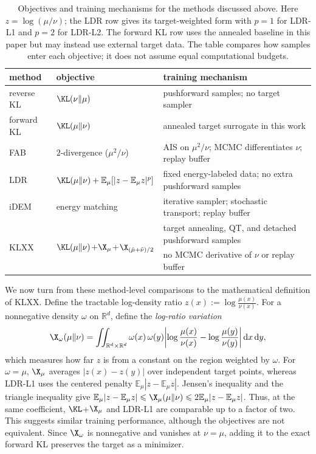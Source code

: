 \documentclass{article}
\begin{document}
\begin{table}[htb]
\centering
{\small
\begin{tabular}{@{}lll@{}}
\toprule
method & objective & training mechanism \\
\midrule
reverse KL & $\KL(\nu\|\mu)$ & pushforward samples; no target sampler \\
forward KL & $\KL(\mu\|\nu)$ & annealed target surrogate in this work \\
FAB & $2$-divergence ($\mu^2/\nu$) & AIS on $\mu^2/\nu$; MCMC differentiates $\nu$; replay buffer \\
LDR & $\KL(\mu\|\nu)+\mathbb E_\mu[|z-\mathbb E_\mu z|^p]$ & fixed energy-labeled data; no extra pushforward samples \\
iDEM & energy matching & iterative sampler; stochastic transport; replay buffer \\
\multirow{2}{*}{KLXX} &
\multirow{2}{*}{$\KL(\mu\|\nu)$+$\X_\mu$+$\X_{(\hat\mu+\bar\nu)/2}$} &
target annealing, QT, and detached pushforward samples \\
& & no MCMC derivative of $\nu$ or replay buffer \\
\bottomrule
\end{tabular}
}
\caption{Objectives and training mechanisms for the methods discussed above. Here $z=\log(\mu/\nu)$; the LDR row gives its target-weighted form with $p=1$ for LDR-L1 and $p=2$ for LDR-L2. The forward KL row uses the annealed baseline in this paper but may instead use external target data. The table compares how samples enter each objective; it does not assume equal computational budgets.}
\label{tab: methods}
\end{table}


We now turn from these method-level comparisons to the mathematical definition of KLXX. Define the tractable log-density ratio $z(x):=\log\frac{\mu(x)}{\nu(x)}$. For a nonnegative density $\omega$ on $\mathbb R^d$, define the \emph{log-ratio variation}
\begin{equation}
    \X_\omega(\mu\|\nu) = \iint_{\mathbb R^d\times\mathbb R^d} \omega(x)\,\omega(y)
    \biggl|\log\frac{\mu(x)}{\nu(x)} - \log\frac{\mu(y)}{\nu(y)}\biggr| \D x\D y,
    \label{eq: X}
\end{equation}
which measures how far $z$ is from a constant on the region weighted by $\omega$. For $\omega=\mu$, $\X_\mu$ averages $|z(x)-z(y)|$ over independent target points, whereas LDR-L1 uses the centered penalty $\mathbb E_\mu|z-\mathbb E_\mu z|$. Jensen's inequality and the triangle inequality give $\mathbb E_\mu|z-\mathbb E_\mu z|\Le\X_\mu(\mu\|\nu)\Le2\mathbb E_\mu|z-\mathbb E_\mu z|$. Thus, at the same coefficient, $\KL$+$\X_\mu$ and LDR-L1 are comparable up to a factor of two. This suggests similar training performance, although the objectives are not equivalent. Since $\X_\omega$ is nonnegative and vanishes at $\nu=\mu$, adding it to the exact forward KL preserves the target as a minimizer.
\end{document}
